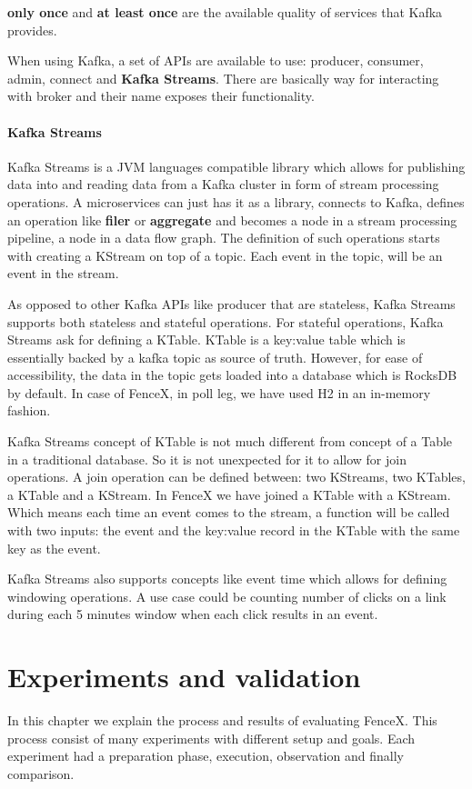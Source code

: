 \documentclass[a4]{report}
\begin{document}
    \textbf{only once} and \textbf{at least once} are the available quality of services that Kafka provides.

    When using Kafka, a set of APIs are available to use: producer, consumer, admin, connect and \textbf{Kafka Streams}.
    There are basically way for interacting with broker and their name exposes their functionality.

    \subsubsection{Kafka Streams}
    Kafka Streams\cite{kafkaStreamsJoins} is a JVM languages compatible library which allows for publishing
    data into and reading data from a Kafka cluster in form of stream processing operations.
    A microservices can just has it as a library, connects to Kafka, defines an operation like \textbf{filer} or
    \textbf{aggregate} and becomes a node in a stream processing pipeline, a node in a data flow graph.
    The definition of such operations starts with creating a KStream on top of a topic.
    Each event in the topic, will be an event in the stream.

    As opposed to other Kafka APIs like producer that are stateless, Kafka Streams supports both stateless and
    stateful operations.
    For stateful operations, Kafka Streams ask for defining a KTable.
    KTable is a key:value table which is essentially backed by a kafka topic as source of truth.
    However, for ease of accessibility, the data in the topic gets loaded into a database which is RocksDB by default.
    In case of FenceX, in poll leg, we have used H2 in an in-memory fashion.

    Kafka Streams concept of KTable is not much different from concept of a Table in a traditional database.
    So it is not unexpected for it to allow for join operations.
    A join operation can be defined between: two KStreams, two KTables, a KTable and a KStream.
    In FenceX we have joined a KTable with a KStream.
    Which means each time an event comes to the stream, a function will be called with two inputs: the event and the
    key:value record in the KTable with the same key as the event.

    Kafka Streams also supports concepts like event time which allows for defining windowing operations.
    A use case could be counting number of clicks on a link during each 5 minutes window when each click results in
    an event.


    \chapter{Experiments and validation}
    In this chapter we explain the process and results of evaluating FenceX.
    This process consist of many experiments with different setup and goals.
    Each experiment had a preparation phase, execution, observation and finally comparison.
\end{document}
